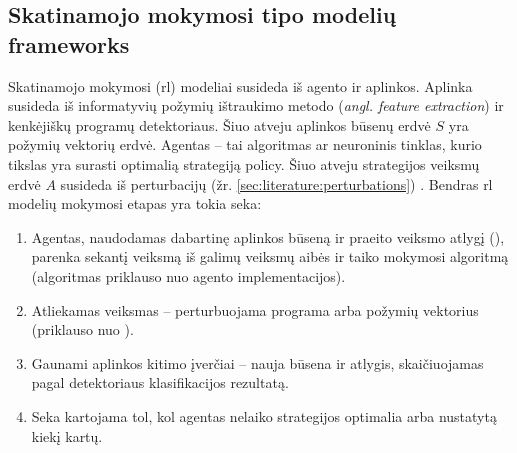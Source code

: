 \subsection{Skatinamojo mokymosi tipo modelių \glspl{framework}}\label{sec:literature:rl}

Skatinamojo mokymosi (\acs{rl}) modeliai susideda iš agento ir aplinkos.
Aplinka susideda iš informatyvių požymių ištraukimo metodo (\textit{angl.
    feature extraction}) ir kenkėjiškų programų detektoriaus. Šiuo atveju aplinkos
būsenų erdvė $S$ yra požymių vektorių erdvė. Agentas -- tai algoritmas ar neuroninis
tinklas, kurio tikslas yra surasti optimalią strategiją \gls{policy}. Šiuo
atveju strategijos veiksmų erdvė $A$ susideda iš perturbacijų (žr.
\ref{sec:literature:perturbations}) \citeplace. Bendras \ac{rl} modelių
mokymosi etapas yra tokia seka:
\begin{enumerate}
    \item Agentas, naudodamas dabartinę aplinkos būseną ir praeito veiksmo atlygį
          (), parenka sekantį veiksmą iš galimų veiksmų aibės ir taiko mokymosi algoritmą (algoritmas priklauso nuo agento implementacijos).
    \item Atliekamas veiksmas -- perturbuojama programa arba požymių vektorius (priklauso
          nuo ).
    \item Gaunami aplinkos kitimo įverčiai -- nauja būsena ir atlygis, skaičiuojamas
          pagal detektoriaus klasifikacijos rezultatą.
    \item Seka kartojama tol, kol agentas nelaiko strategijos optimalia arba nustatytą
          kiekį kartų.
\end{enumerate}
\citeplace{}

